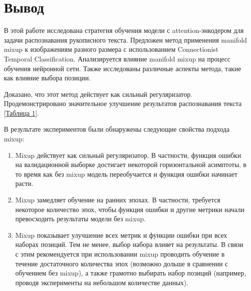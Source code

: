 \section{Вывод}
\label{sec:Chapter5} 

В этой работе исследована стратегия обучения модели с attention-энкодером для задачи распознавания рукописного текста. Предложен метод применения manifold mixup к изображениям разного размера с использованием Connectionist Temporal Classification. Анализируется влияние manifold mixup на процесс обучения нейронной сети. Также исследованы различные аспекты метода, такие как влияние выбора позиции. 

Доказано, что этот метод действует как сильный регуляризатор. Продемонстрировано значительное улучшение результатов распознавания текста \hyperref[tab:mixup_size_max]{[Таблица 1]}. 

В результате экспериментов были обнаружены следующие свойства подхода mixup:
\begin{enumerate}
\item Mixup действует как сильный регуляризатор. В частности, функция ошибки на валидационной выборке достигает некоторой горизонтальной асимптоты, в то время как без mixup модель переобучается и функция ошибки начинает расти.
\item Mixup замедляет обучение на ранних эпохах. В частности, требуется некоторое количество эпох, чтобы функция ошибки и другие метрики начали превосходить результаты модели без mixup.
\item Mixup показывает улучшение всех метрик и функции ошибки при всех наборах позиций. Тем не менее, выбор набора влияет на результаты.
В связи с этим рекомендуется при использовании mixup проводить обучение в течение достаточного количества эпох (возможно дольше в сравнении с обучением без mixup), а также грамотно выбирать набор позиций (например, проводя эксперименты на небольшом количестве данных).
\end{enumerate}
\newpage